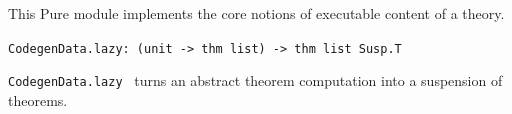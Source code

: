 \begin{isabellebody}
\begin{isamarkuptext}
\begin{description}
  \end{description}%
\end{isamarkuptext}%
\isamarkuptrue%
%
\endisatagmlref
{\isafoldmlref}%
%
\isadelimmlref
%
\endisadelimmlref
%
\isamarkuptrue%
%
\begin{isamarkuptext}%
This Pure module implements the core notions of
  executable content of a theory.%
\end{isamarkuptext}%
\isamarkuptrue%
%
\isamarkuptrue%
%
\isadelimmlref
%
\endisadelimmlref
%
\isatagmlref
%
\begin{isamarkuptext}%
\begin{mldecls}
  \verb|CodegenData.lazy: (unit -> thm list) -> thm list Susp.T|
  \end{mldecls}

  \begin{description}

  \item \verb|CodegenData.lazy|~ turns an abstract
     theorem computation  into a suspension of theorems.


\end{description}
\end{isamarkuptext}
\end{isabellebody}
